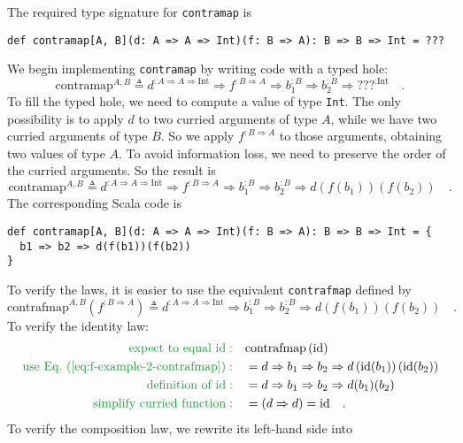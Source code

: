 The required type signature for \lstinline!contramap! is
\begin{lstlisting}
def contramap[A, B](d: A => A => Int)(f: B => A): B => B => Int = ???
\end{lstlisting}
We begin implementing \lstinline!contramap! by writing code with
a typed hole:
\[
\text{contramap}^{A,B}\triangleq d^{:A\Rightarrow A\Rightarrow\text{Int}}\Rightarrow f^{:B\Rightarrow A}\Rightarrow b_{1}^{:B}\Rightarrow b_{2}^{:B}\Rightarrow\text{???}^{:\text{Int}}\quad.
\]
To fill the typed hole, we need to compute a value of type \lstinline!Int!.
The only possibility is to apply $d$ to two curried arguments of
type $A$, while we have two curried arguments of type $B$. So we
apply $f^{:B\Rightarrow A}$ to those arguments, obtaining two values
of type $A$. To avoid information loss, we need to preserve the order
of the curried arguments. So the result is
\[
\text{contramap}^{A,B}\triangleq d^{:A\Rightarrow A\Rightarrow\text{Int}}\Rightarrow f^{:B\Rightarrow A}\Rightarrow b_{1}^{:B}\Rightarrow b_{2}^{:B}\Rightarrow d\left(f(b_{1})\right)\left(f(b_{2})\right)\quad.
\]
The corresponding Scala code is 
\begin{lstlisting}
def contramap[A, B](d: A => A => Int)(f: B => A): B => B => Int = {
  b1 => b2 => d(f(b1))(f(b2))
}
\end{lstlisting}
To verify the laws, it is easier to use the equivalent \lstinline!contrafmap!
defined by
\begin{equation}
\text{contrafmap}^{A,B}(f^{:B\Rightarrow A})\triangleq d^{:A\Rightarrow A\Rightarrow\text{Int}}\Rightarrow b_{1}^{:B}\Rightarrow b_{2}^{:B}\Rightarrow d\left(f(b_{1})\right)\left(f(b_{2})\right)\quad.\label{eq:f-example-2-contrafmap}
\end{equation}
To verify the identity law:
\begin{align*}
{\color{greenunder}\text{expect to equal }\text{id}:}\quad & \text{contrafmap}\left(\text{id}\right)\\
{\color{greenunder}\text{use Eq.~(\ref{eq:f-example-2-contrafmap})}:}\quad & =d\Rightarrow b_{1}\Rightarrow b_{2}\Rightarrow d\left(\text{id}(b_{1})\right)\left(\text{id}(b_{2})\right)\\
{\color{greenunder}\text{definition of }\text{id}:}\quad & =d\Rightarrow b_{1}\Rightarrow b_{2}\Rightarrow d(b_{1})(b_{2})\\
{\color{greenunder}\text{simplify curried function}:}\quad & =\left(d\Rightarrow d\right)=\text{id}\quad.
\end{align*}
To verify the composition law, we rewrite its left-hand side into
